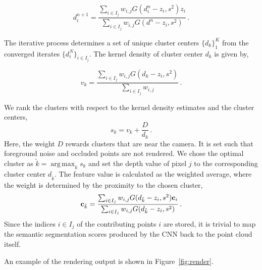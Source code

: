 \documentclass[runningheads,a4paper]{llncs}
\DeclareMathOperator*{\argmax}{arg\,max}
\begin{document}
\begin{equation}
	d^{n+1}_i = \frac{\sum_{i \in I_j} w_{i,j} G(d^n_i - z_i,s^2) z_i}{\sum_{i \in I_j} w_{i,j}G(d^n - z_i,s^2) } \,.
	\label{eq:meanshift}
\end{equation}

The iterative process determines a set of unique cluster centers $\{d_k\}^K_1$ from the converged iterates $\{d_i^N\}_{i \in I_j}$. The kernel density of cluster center $d_k$ is given by,

\begin{equation}
	v_k = \frac{\sum_{i \in I_j} w_{i,j} G(d_k - z_i,s^2)}{\sum_{i \in I_j} w_{i,j}} \,.
	\label{eq:kde}
\end{equation}

We rank the clusters with respect to the kernel density estimates and the cluster centers,
\begin{equation}
	s_k = v_k + \frac{D}{d_k} \,.
	\label{eq:cluster_rank}
\end{equation}
Here, the weight $D$ rewards clusters that are near the camera. It is set such that foreground noise and occluded points are not rendered. We chose the optimal cluster as $\tilde{k} = \argmax_k s_k$ and set the depth value of pixel $j$ to the corresponding cluster center $d_{\tilde{k}}$. The feature value is calculated as the weighted average, where the weight is determined by the proximity to the chosen cluster,
\begin{equation}
{\bf c}_{\tilde{k}} = \frac{\sum_{i \in I_j} w_{i,j} G(d_{\tilde{k}} - z_i,s^2) {\bf c}_i}{\sum_{i \in I_j} w_{i,j}G(d_{\tilde{k}} - z_i,s^2) }\,.
\label{eq:feature}
\end{equation}
Since the indices $i \in I_j$ of the contributing points $i$ are stored, it is trivial to map the semantic segmentation scores produced by the CNN back to the point cloud itself. 

An example of the rendering output is shown in Figure~\ref{fig:render}.
\end{document}
